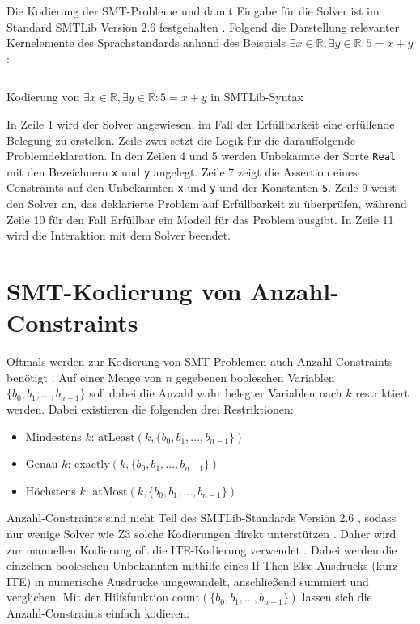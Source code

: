 Die Kodierung der SMT-Probleme und damit Eingabe für die Solver ist im Standard SMTLib Version 2.6 festgehalten \cite{smtlib}.
Folgend die Darstellung relevanter Kernelemente des Sprachstandards anhand des Beispiels
$\exists x \in \mathbb{R}, \exists y \in \mathbb{R}: 5 = x + y$:

\begin{listing}[H]
    \inputminted[linenos=true]{bash}{Code/SMT/SMTLibSimple.smt2}
    \caption{Kodierung von $\exists x \in \mathbb{R}, \exists y \in \mathbb{R}: 5 = x + y$ in SMTLib-Syntax}
    \label{listing:smtlibsimple}
\end{listing}

In Zeile 1 wird der Solver angewiesen, im Fall der Erfüllbarkeit eine erfüllende Belegung zu erstellen.
Zeile zwei setzt die Logik für die darauffolgende Problemdeklaration.
In den Zeilen 4 und 5 werden Unbekannte der Sorte \texttt{Real} mit den Bezeichnern \texttt{x} und \texttt{y} angelegt.
Zeile 7 zeigt die Assertion eines Constraints auf den Unbekannten \texttt{x} und \texttt{y} und der Konstanten \texttt{5}.
Zeile 9 weist den Solver an, das deklarierte Problem auf Erfüllbarkeit zu überprüfen, während Zeile 10 für den Fall Erfüllbar ein Modell für das Problem ausgibt.
In Zeile 11 wird die Interaktion mit dem Solver beendet.

\section{SMT-Kodierung von Anzahl-Constraints}
\label{sec:smtcardinality}
Oftmals werden zur Kodierung von SMT-Problemen auch Anzahl-Constraints benötigt \cite{kovasznai}.
Auf einer Menge von $n$ gegebenen booleschen Variablen $\{b_0, b_1, \ldots, b_{n-1}\}$ soll dabei die Anzahl wahr belegter Variablen nach $k$ restriktiert werden.
Dabei existieren die folgenden drei Restriktionen:
\begin{itemize}
    \item Mindestens $k$: $\text{atLeast}(k, \{b_0, b_1, \ldots, b_{n-1}\})$
    \item Genau $k$: $\text{exactly}(k, \{b_0, b_1, \ldots, b_{n-1}\})$
    \item Höchstens $k$: $\text{atMost}(k, \{b_0, b_1, \ldots, b_{n-1}\})$
\end{itemize}

Anzahl-Constraints sind nicht Teil des SMTLib-Standards Version 2.6 \cite{smtlib}, sodass nur wenige Solver wie Z3 solche Kodierungen direkt unterstützen \cite{z3Cardinality}.
Daher wird zur manuellen Kodierung oft die ITE-Kodierung verwendet \cite{kovasznai}.
Dabei werden die einzelnen booleschen Unbekannten mithilfe eines If-Then-Else-Ausdrucks (kurz ITE) in numerische Ausdrücke umgewandelt, anschließend summiert und verglichen.
Mit der Hilfsfunktion $\text{count}(\{b_0, b_1, \ldots, b_{n-1}\})$ lassen sich die Anzahl-Constraints einfach kodieren:

